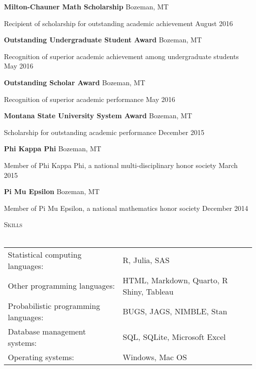 \documentclass[a4paper]{article}
\newcommand{\lineunder} {
	\vspace*{-8pt} \\
	\hspace*{-18pt} \hrulefill \\
}
\newcommand{\header} [1] {
	{\hspace*{-18pt}\vspace*{6pt} \textcolor{Cerulean}{\textsc{#1}}}
	\vspace*{-6pt} \textcolor{Cerulean}{\lineunder}
}
\begin{document}
\vspace*{2mm}

\textbf{Milton-Chauner Math Scholarship} \hfill Bozeman, MT

Recipient of scholarship for outstanding academic achievement
\hfill August 2016

\vspace*{2mm}

\textbf{Outstanding Undergraduate Student Award} \hfill Bozeman, MT

Recognition of superior academic achievement among undergraduate
students \hfill May 2016

\vspace*{2mm}

\textbf{Outstanding Scholar Award} \hfill Bozeman, MT

Recognition of superior academic performance \hfill May 2016

\vspace*{2mm}

\textbf{Montana State University System Award} \hfill Bozeman, MT

Scholarship for outstanding academic performance \hfill December 2015

\vspace*{2mm}

\textbf{Phi Kappa Phi} \hfill Bozeman, MT

Member of Phi Kappa Phi, a national multi-disciplinary honor society
\hfill March 2015

\vspace*{2mm}

\textbf{Pi Mu Epsilon} \hfill Bozeman, MT

Member of Pi Mu Epsilon, a national mathematics honor society
\hfill December 2014

\vspace*{2mm}

\header{Skills}
\vspace*{2mm}
\begin{tabular}{ l l }
  Statistical computing languages:  & R, Julia, SAS \\
    Other programming languages:         &  HTML, Markdown, Quarto, R Shiny, Tableau \\
  Probabilistic programming languages:         & BUGS, JAGS, NIMBLE, Stan \\
    Database management systems:         & SQL, SQLite, Microsoft Excel \\
    Operating systems:       & Windows, Mac OS \\
\end{tabular}
\vspace*{2mm}
\end{document}
